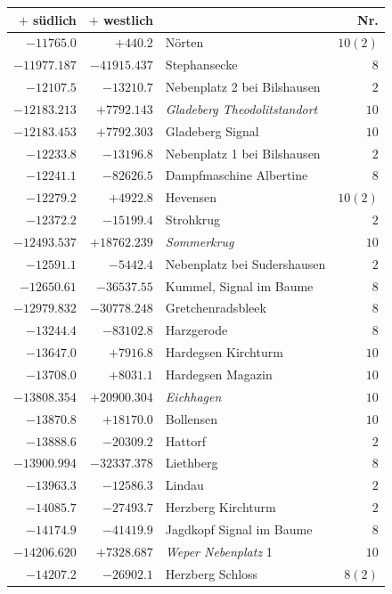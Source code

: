 \clearpage{}%
\begin{center}\begingroup\fontsize{8}{9}\selectfont
\setlength{\tabcolsep}{4pt}
\begin{tabular}{r|r|p{170pt}|r}\hline
\(+\) südlich&\(+\) westlich&&Nr.\\\hline
\(-11765.0\)&\(+440.2\)&Nörten&\(10 (2)\)\\
\(-11977.187\)&\(-41915.437\)&Stephansecke&\(8\)\\
\(-12107.5\)&\(-13210.7\)&Nebenplatz 2 bei Bilshausen&\(2\)\\
\(-12183.213\)&\(+7792.143\)&\textit{Gladeberg Theodolitstandort}&\(10\)\\
\(-12183.453\)&\(+7792.303\)&Gladeberg Signal&\(10\)\\
\(-12233.8\)&\(-13196.8\)&Nebenplatz 1 bei Bilshausen&\(2\)\\
\(-12241.1\)&\(-82626.5\)&Dampfmaschine Albertine&\(8\)\\
\(-12279.2\)&\(+4922.8\)&Hevensen&\(10 (2)\)\\
\(-12372.2\)&\(-15199.4\)&Strohkrug&\(2\)\\
\(-12493.537\)&\(+18762.239\)&\textit{Sommerkrug}&\(10\)\\
\(-12591.1\)&\(-5442.4\)&Nebenplatz bei Sudershausen&\(2\)\\
\(-12650.61\)&\(-36537.55\)&Kummel, Signal im Baume&\(8\)\\
\(-12979.832\)&\(-30778.248\)&Gretchenradsbleek&\(8\)\\
\(-13244.4\)&\(-83102.8\)&Harzgerode&\(8\)\\
\(-13647.0\)&\(+7916.8\)&Hardegsen Kirchturm&\(10\)\\
\(-13708.0\)&\(+8031.1\)&Hardegsen Magazin&\(10\)\\
\(-13808.354\)&\(+20900.304\)&\textit{Eichhagen}&\(10\)\\
\(-13870.8\)&\(+18170.0\)&Bollensen&\(10\)\\
\(-13888.6\)&\(-20309.2\)&Hattorf&\(2\)\\
\(-13900.994\)&\(-32337.378\)&Liethberg&\(8\)\\
\(-13963.3\)&\(-12586.3\)&Lindau&\(2\)\\
\(-14085.7\)&\(-27493.7\)&Herzberg Kirchturm&\(2\)\\
\(-14174.9\)&\(-41419.9\)&Jagdkopf Signal im Baume&\(8\)\\
\(-14206.620\)&\(+7328.687\)&\textit{Weper Nebenplatz} 1&\(10\)\\
\(-14207.2\)&\(-26902.1\)&Herzberg Schloss&\(8 (2)\)\\

\end{tabular}
\end{center}
